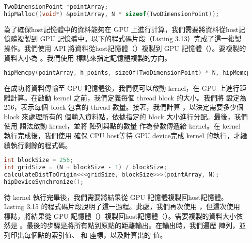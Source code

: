 \begin{lstlisting}[language=C, caption={GPU記憶體的配置}, label={12th:example}]
TwoDimensionPoint *pointArray;
hipMalloc((void*) &pointArray, N * sizeof(TwoDimensionPoint));
\end{lstlisting}

為了確保host記憶體中的資料能夠在 GPU 上進行計算，我們需要將資料從host記憶體複製到 GPU 記憶體中。以下的程式碼片段（Listing 3.13）完成了這一複製操作。我們使用  API 將資料從host記憶體（）複製到 GPU 記憶體（）。要複製的資料大小為 。我們使用  標誌來指定記憶體複製的方向。

\begin{lstlisting}[language=C, caption={從CPU到GPU的記憶體複製}, label={13th:example}]
hipMemcpy(pointArray, h_points, sizeOf(TwoDimensionPoint) * N, hipMemcpyHostToDevice);
\end{lstlisting}

在成功將資料傳輸至 GPU 記憶體後，我們便可以啟動  kernel，在 GPU 上進行距離計算。在啟動 kernel 之前，我們定義每個 thread block 的大小。我們將  設定為 256，表示每個 block 包含的 thread 數量。接著，我們計算 ，以決定需要多少個 block 來處理所有的  個輸入資料點，依據指定的 block 大小進行分配。最後，我們使用  語法啟動 kernel，並將  陣列與點的數量  作為參數傳遞給 kernel。在 kernel 執行完成後，我們使用  確保 CPU host等待 GPU device完成 kernel 的執行，才繼續執行剩餘的程式碼。

\begin{lstlisting}[language=C, caption={啟動kernel}, label={14th:example}]
int blockSize = 256;
int gridSize = (N + blockSize - 1) / blockSize;
calculateDistToOrigin<<<gridSize, blockSize>>>(pointArray, N);
hipDeviceSynchronize();
\end{lstlisting}

待 kernel 執行完畢後，我們需要將結果從 GPU 記憶體複製回host記憶體。Listing 3.15 的程式碼片段說明了這一過程。此處，我們再次使用 ，但這次使用  標誌，將結果從 GPU 記憶體（）複製回host記憶體（）。需要複製的資料大小依然是 。最後的步驟是將所有點到原點的距離輸出。在輸出時，我們遍歷  陣列，並列印出每個點的索引值、 和  座標，以及計算出的  值。

